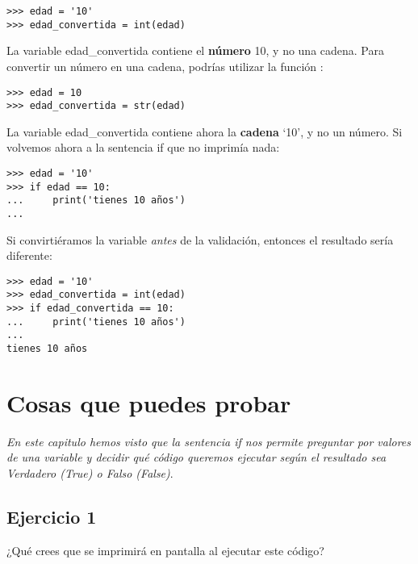 \begin{listing}
\begin{verbatim}
>>> edad = '10'
>>> edad_convertida = int(edad)
\end{verbatim}
\end{listing}

\noindent
La variable edad\_convertida contiene el \textbf{número} 10, y no una cadena. Para convertir un número en una cadena, podrías utilizar la función :

\begin{listing}
\begin{verbatim}
>>> edad = 10
>>> edad_convertida = str(edad)
\end{verbatim}
\end{listing}

\noindent
La variable edad\_convertida contiene ahora la \textbf{cadena} `10', y no un número.  Si volvemos ahora a la sentencia if que no imprimía nada:

\begin{listing}
\begin{verbatim}
>>> edad = '10'
>>> if edad == 10:
...     print('tienes 10 años')
...
\end{verbatim}
\end{listing}

\noindent
Si convirtiéramos la variable \emph{antes} de la validación, entonces el resultado sería diferente:

\begin{listing}
\begin{verbatim}
>>> edad = '10'
>>> edad_convertida = int(edad)
>>> if edad_convertida == 10:
...     print('tienes 10 años')
...
tienes 10 años
\end{verbatim}
\end{listing}

\section{Cosas que puedes probar}

\emph{En este capitulo hemos visto que la sentencia if nos permite preguntar por valores de una variable y decidir qué código queremos ejecutar según el resultado sea Verdadero (True) o Falso (False)}.

\subsection*{Ejercicio 1}
¿Qué crees que se imprimirá en pantalla al ejecutar este código?

